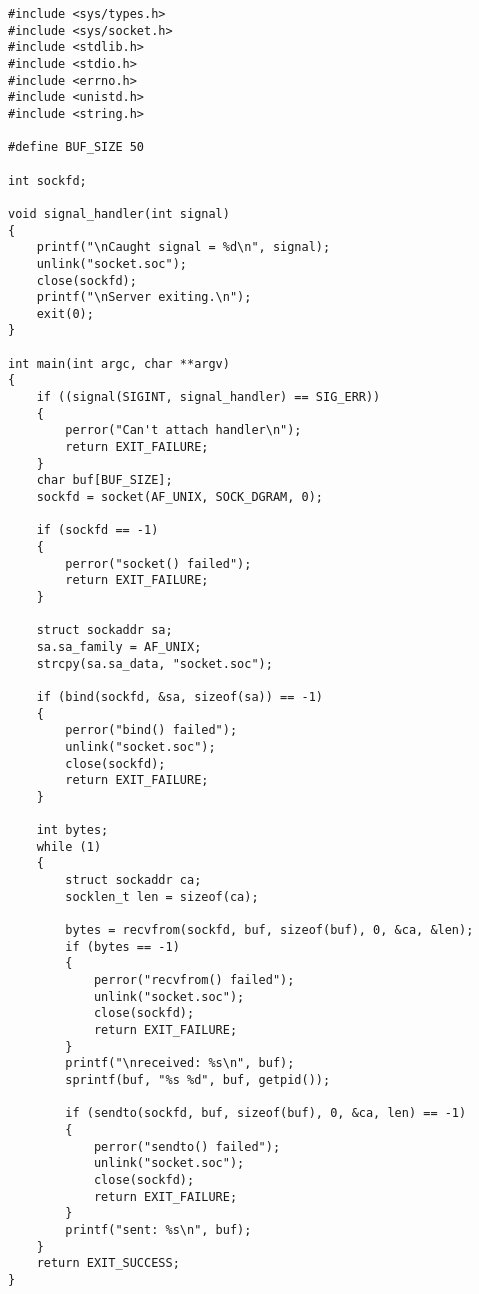 \begin{lstlisting}
#include <sys/types.h>
#include <sys/socket.h>
#include <stdlib.h>
#include <stdio.h>
#include <errno.h>
#include <unistd.h>
#include <string.h>

#define BUF_SIZE 50

int sockfd;

void signal_handler(int signal)
{
    printf("\nCaught signal = %d\n", signal);
    unlink("socket.soc");
    close(sockfd);
    printf("\nServer exiting.\n");
    exit(0);
}

int main(int argc, char **argv)
{
    if ((signal(SIGINT, signal_handler) == SIG_ERR)) 
    {
        perror("Can't attach handler\n");
        return EXIT_FAILURE;
    }
    char buf[BUF_SIZE];
    sockfd = socket(AF_UNIX, SOCK_DGRAM, 0);

    if (sockfd == -1)
    {
        perror("socket() failed");
        return EXIT_FAILURE;
    }

    struct sockaddr sa;
    sa.sa_family = AF_UNIX;
    strcpy(sa.sa_data, "socket.soc");

    if (bind(sockfd, &sa, sizeof(sa)) == -1) 
    {
        perror("bind() failed");
        unlink("socket.soc");
        close(sockfd);
        return EXIT_FAILURE;
    }

    int bytes;
    while (1) 
    {
        struct sockaddr ca;
        socklen_t len = sizeof(ca);

        bytes = recvfrom(sockfd, buf, sizeof(buf), 0, &ca, &len);
        if (bytes == -1) 
        {
            perror("recvfrom() failed");
            unlink("socket.soc");
            close(sockfd);
            return EXIT_FAILURE;
        }
        printf("\nreceived: %s\n", buf);
        sprintf(buf, "%s %d", buf, getpid());
        
        if (sendto(sockfd, buf, sizeof(buf), 0, &ca, len) == -1)
        {
            perror("sendto() failed");
            unlink("socket.soc");
            close(sockfd);
            return EXIT_FAILURE;
        }
        printf("sent: %s\n", buf);
    }
    return EXIT_SUCCESS;
}
\end{lstlisting}


